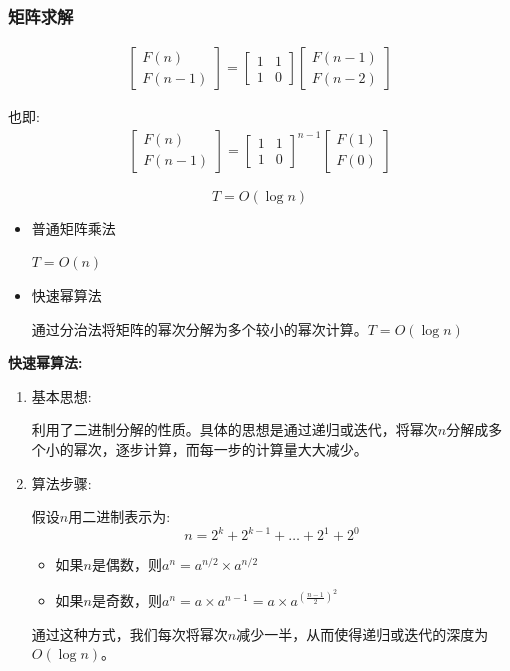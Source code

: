 \documentclass{article}
\begin{document}
\subsubsection{矩阵求解}
\begin{align*}
    \begin{bmatrix}
        F(n)\\
        F(n-1)
    \end{bmatrix}
    =
    \begin{bmatrix}
        1 & 1 \\
        1 & 0
    \end{bmatrix}
    \begin{bmatrix}
        F(n-1) \\
        F(n-2)
    \end{bmatrix}
\end{align*}\par
也即:
\begin{align*}
    \begin{bmatrix}
        F(n)\\
        F(n-1)
    \end{bmatrix}
    =
    \begin{bmatrix}
        1 & 1 \\
        1 & 0
    \end{bmatrix}^{n-1}
    \begin{bmatrix}
        F(1) \\ F(0)
        \end{bmatrix}
\end{align*}\par
$$T = O(\log n)$$
\par
\begin{itemize}
    \item 普通矩阵乘法\par
    $T = O(n)$
    \item 快速幂算法\par
    通过分治法将矩阵的幂次分解为多个较小的幂次计算。$T = O(\log n)$
\end{itemize}
\textbf{快速幂算法:}\par
\begin{enumerate}
    \item 基本思想:\par
    利用了二进制分解的性质。具体的思想是通过递归或迭代，将幂次$n$分解成多个小的幂次，逐步计算，而每一步的计算量大大减少。
    \item 算法步骤:\par
    假设$n$用二进制表示为:
    $$n = 2^k + 2^{k-1} + \dots + 2^1 + 2^0$$
    \begin{itemize}
        \item 如果$n$是偶数，则$a^n = a^{n/2} \times a^{n/2}$
        \item 如果$n$是奇数，则$a^n = a \times a^{n-1} = a \times a^{{(\frac{n-1}{2})}^2}$
    \end{itemize}
    通过这种方式，我们每次将幂次$n$减少一半，从而使得递归或迭代的深度为$O(\log n)$。
\end{enumerate}
\end{document}
